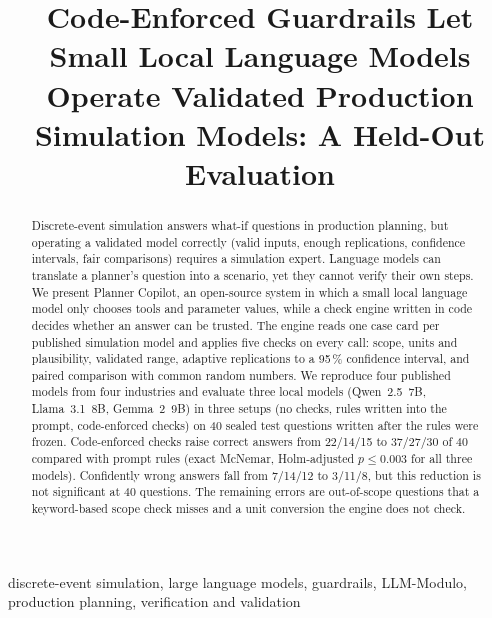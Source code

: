 \documentclass[conference]{IEEEtran}
\begin{document}
\title{Code-Enforced Guardrails Let Small Local Language Models Operate Validated Production Simulation Models: A Held-Out Evaluation}

\author{
}

\maketitle

\begin{abstract}
Discrete-event simulation answers what-if questions in production planning, but operating a validated model correctly (valid inputs, enough replications, confidence intervals, fair comparisons) requires a simulation expert. Language models can translate a planner's question into a scenario, yet they cannot verify their own steps. We present Planner Copilot, an open-source system in which a small local language model only chooses tools and parameter values, while a check engine written in code decides whether an answer can be trusted. The engine reads one case card per published simulation model and applies five checks on every call: scope, units and plausibility, validated range, adaptive replications to a 95\,\% confidence interval, and paired comparison with common random numbers. We reproduce four published models from four industries and evaluate three local models (Qwen~2.5~7B, Llama~3.1~8B, Gemma~2~9B) in three setups (no checks, rules written into the prompt, code-enforced checks) on 40 sealed test questions written after the rules were frozen. Code-enforced checks raise correct answers from 22/14/15 to 37/27/30 of 40 compared with prompt rules (exact McNemar, Holm-adjusted $p \le 0.003$ for all three models). Confidently wrong answers fall from 7/14/12 to 3/11/8, but this reduction is not significant at 40 questions. The remaining errors are out-of-scope questions that a keyword-based scope check misses and a unit conversion the engine does not check.
\end{abstract}

\begin{IEEEkeywords}
discrete-event simulation, large language models, guardrails, LLM-Modulo, production planning, verification and validation
\end{IEEEkeywords}
\end{document}
